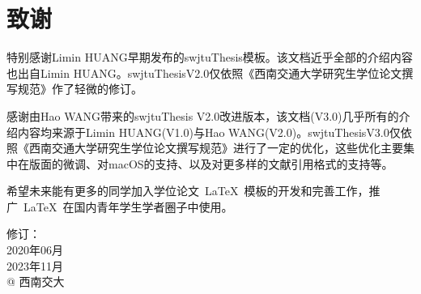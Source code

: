 \chapter*{致\qquad{}谢}

特别感谢Limin HUANG早期发布的swjtuThesis模板。该文档近乎全部的介绍内容也出自Limin HUANG。swjtuThesisV2.0仅依照《西南交通大学研究生学位论文撰写规范》作了轻微的修订。

\par
感谢由Hao WANG带来的swjtuThesis V2.0改进版本，该文档(V3.0)几乎所有的介绍内容均来源于Limin HUANG(V1.0)与Hao WANG(V2.0)。swjtuThesisV3.0仅依照《西南交通大学研究生学位论文撰写规范》进行了一定的优化，这些优化主要集中在版面的微调、对macOS的支持、以及对更多样的文献引用格式的支持等。

\par
希望未来能有更多的同学加入学位论文~\LaTeX{}~模板的开发和完善工作，推广~\LaTeX{}~在国内青年学生学者圈子中使用。

\vspace{25mm}
\begin{flushright}
	修订：\\
	2020年06月 \\
	2023年11月 \\
	@ 西南交大
\end{flushright}